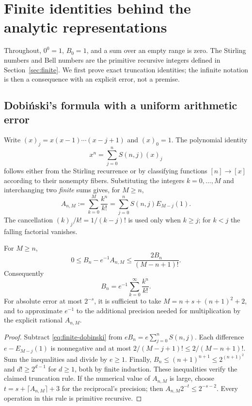 \section{Finite identities behind the analytic representations}\label{sec:series}

Throughout, $0^0=1$, $B_0=1$, and a sum over an empty range is zero.  The
Stirling numbers and Bell numbers are the primitive recursive integers defined
in Section~\ref{sec:finite}.  We first prove exact truncation identities; the
infinite notation is then a consequence with an explicit error, not a premise.

\subsection{Dobi\'nski's formula with a uniform arithmetic error}

Write $(x)_j=x(x-1)\cdots(x-j+1)$ and $(x)_0=1$.  The polynomial identity
\[
 x^n=\sum_{j=0}^n S(n,j)(x)_j
\]
follows either from the Stirling recurrence or by classifying functions
$[n]\to[x]$ according to their nonempty fibers.  Substituting the integers
$k=0,\ldots,M$ and interchanging two \emph{finite} sums gives, for $M\ge n$,
\begin{equation}\label{eq:finite-dobinski}
 A_{n,M}:=\sum_{k=0}^M\frac{k^n}{k!}
 =\sum_{j=0}^n S(n,j) E_{M-j}(1).
\end{equation}
The cancellation $(k)_j/k!=1/(k-j)!$ is used only when $k\ge j$; for $k<j$
the falling factorial vanishes.

\begin{theorem}\label{thm:dobinski}
For $M\ge n$,
\begin{equation}\label{eq:dobinski-error}
 0\le B_n-e^{-1}A_{n,M}\le
 \frac{2B_n}{(M-n+1)!}.
\end{equation}
Consequently
\[
 B_n=e^{-1}\sum_{k=0}^{\infty}\frac{k^n}{k!}.
\]
For absolute error at most $2^{-s}$, it is sufficient to take
$M=n+s+(n+1)^2+2$, and to approximate $e^{-1}$ to the additional precision
needed for multiplication by the explicit rational $A_{n,M}$.
\end{theorem}
\begin{proof}
Subtract \eqref{eq:finite-dobinski} from
$eB_n=e\sum_{j=0}^nS(n,j)$.  Each difference $e-E_{M-j}(1)$ is nonnegative
and at most $2/(M-j+1)!\le2/(M-n+1)!$.  Sum the inequalities and divide by
$e\ge1$.  Finally, $B_n\le(n+1)^{n+1}\le2^{(n+1)^2}$ and
$d!\ge2^{d-1}$ for $d\ge1$, both by finite induction.  These inequalities
verify the claimed truncation rule.  If the numerical value of $A_{n,M}$ is
large, choose $t=s+\lceil A_{n,M}\rceil+3$ for the reciprocal's precision;
then $A_{n,M}2^{-t}\le2^{-s-2}$.  Every operation in this rule is primitive
recursive.
\end{proof}

